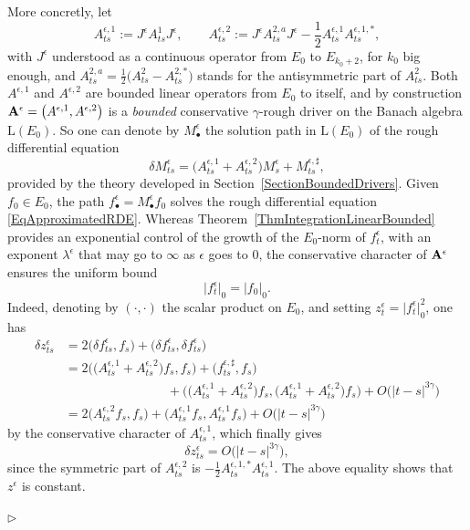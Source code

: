 \documentclass[11pt,a4paper]{amsart}
\numberwithin{equation}{section} %
\newenvironment{Dem}{%
    \begin{list}{\hspace{0.5cm}{\sc Proof --}}{%
        \setlength{\topsep}{0pt}%
        \setlength{\leftmargin}{0pt}%
        \setlength{\rightmargin}{0pt}%
        \setlength{\listparindent}{0pt}%
        \setlength{\itemindent}{0pt}%
        \setlength{\parsep}{0pt}%
        \addtolength{\leftmargin}{20pt}%
        \addtolength{\rightmargin}{0pt}%
    } \item }{\hfill{\space $\rhd$}\end{list}\smallskip}
\begin{document}
\begin{Dem}
More concretly, let 
$$
A^{\epsilon,1}_{ts} := J^\epsilon A^1_{ts}J^\epsilon,\quad\quad A^{\epsilon,2}_{ts} := J^\epsilon A^{2,a}_{ts}J^\epsilon - \frac1 2 A^{\epsilon,1}_{ts} A^{\epsilon,1,*}_{ts},
$$
with $J^\epsilon$ understood as a continuous operator from $E_0$ to $E_{k_0+2}$, for $k_0$ big enough, and $A^{2,a}_{ts} = \frac{1}{2}\big(A^2_{ts}-A^{2,*}_{ts}\big)$ stands for the antisymmetric part of $A^{2}_{ts}$. Both $A^{\epsilon,1}$ and $A^{\epsilon,2}$ are bounded linear operators from $E_0$ to itself, and by construction ${\bf A}^\epsilon = \big(A^{\epsilon,1},A^{\epsilon,2}\big)$ is a \emph{bounded} conservative $\gamma$-rough driver on the Banach algebra $\textrm{L}(E_0)$. So one can denote by $M^\epsilon_\bullet$ the solution path in $\textrm{L}(E_0)$ of the rough differential equation
$$
\delta M^\epsilon_{ts} = \Big(A^{\epsilon,1}_{ts} + A^{\epsilon,2}_{ts}\Big)M^\epsilon_s + M^{\epsilon,\sharp}_{ts},
$$
provided by the theory developed in Section~\ref{SectionBoundedDrivers}. Given $f_0\in E_0$, the path $f^\epsilon_\bullet = M^\epsilon_\bullet f_0$ solves the rough differential equation \eqref{EqApproximatedRDE}. Whereas Theorem~\ref{ThmIntegrationLinearBounded} provides an exponential control of the growth of the $E_0$-norm of $f^\epsilon_t$, with an exponent $\lambda^\epsilon$ that may go to $\infty$ as $\epsilon$ goes to $0$, the conservative character of ${\bf A}^\epsilon$ ensures the uniform bound
\begin{equation*}
\big| f^\epsilon_t\big|_0 = \big| f_0\big|_0.
\end{equation*}
Indeed, denoting by $(\cdot,\cdot)$ the scalar product on $E_0$, and setting $z^\epsilon_t = \big|f^\epsilon_t\big|^2_0$, one has
\begin{equation*}
\begin{split}
\delta z^\epsilon_{ts} &= 2\big(\delta f^\epsilon_{ts},f_s\big) + \big(\delta f^\epsilon_{ts}, \delta f^\epsilon_{ts}\big) \\
                                    &= 2\Big(\big(A^{\epsilon,1}_{ts}+A^{\epsilon,2}_{ts}\big)f_s , f_s\Big) + \big(f^{\epsilon,\sharp}_{ts},f_s\big) \\
                                    &\quad\quad\quad\quad\quad\quad\quad\quad+ \Big(\big(A^{\epsilon,1}_{ts}+A^{\epsilon,2}_{ts}\big)f_s , \big(A^{\epsilon,1}_{ts}+A^{\epsilon,2}_{ts}\big)f_s\Big) + O\big(|t-s|^{3\gamma}\big) \\
                                    &= 2\Big(A^{\epsilon,2}_{ts}f_s , f_s\Big) + \Big(A^{\epsilon,1}_{ts}f_s , A^{\epsilon,1}_{ts}f_s\Big) + O\big(|t-s|^{3\gamma}\big)
\end{split}
\end{equation*} 
by the conservative character of $A^{\epsilon,1}_{ts}$, which finally gives
$$
\delta z^\epsilon_{ts} = O\big(|t-s|^{3\gamma}\big),
$$
since the symmetric part of $A^{\epsilon,2}_{ts}$ is $-\frac{1}{2}A^{\epsilon,1,*}_{ts}A^{\epsilon,1}_{ts}$. The above equality shows that $z^\epsilon$ is constant.


\end{Dem}
\end{document}
